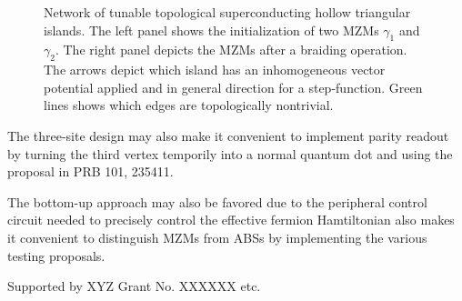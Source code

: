 \documentclass[aps,prb,showpacs,amsmath,twocolumn,amssymb,superscriptaddress]{revtex4-2}
\begin{document}
\begin{figure}[]
  \caption{Network of tunable topological superconducting hollow triangular islands. The left panel shows the initialization of two MZMs $\gamma_1$ and $\gamma_2$. The right panel depicts the MZMs after a braiding operation. The arrows depict which island has an inhomogeneous vector potential applied and in general direction for a step-function. Green lines shows which edges are topologically nontrivial.}
  \label{fig: triangular-network-braiding}
\end{figure}

The three-site design may also make it convenient to implement parity readout by turning the third vertex temporily into a normal quantum dot and using the proposal in PRB 101, 235411. 

The bottom-up approach may also be favored due to the peripheral control circuit needed to precisely control the effective fermion Hamtiltonian also makes it convenient to distinguish MZMs from ABSs by implementing the various testing proposals.

\begin{acknowledgements}
  Supported by XYZ Grant No. XXXXXX etc.
\end{acknowledgements}



\end{document}
